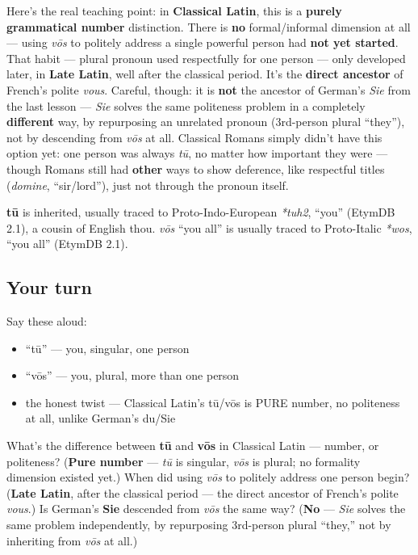 \begin{culture}
Here's the real teaching point: in \textbf{Classical Latin}, this is a \textbf{purely grammatical number} distinction. There is \textbf{no} formal/informal dimension at all — using \emph{vōs} to politely address a single powerful person had \textbf{not yet started}. That habit — plural pronoun used respectfully for one person — only developed later, in \textbf{Late Latin}, well after the classical period. It's the \textbf{direct ancestor} of French's polite \emph{vous}. Careful, though: it is \textbf{not} the ancestor of German's \emph{Sie} from the last lesson — \emph{Sie} solves the same politeness problem in a completely \textbf{different} way, by repurposing an unrelated pronoun (3rd-person plural \textquotedblleft{}they\textquotedblright{}), not by descending from \emph{vōs} at all. Classical Romans simply didn't have this option yet: one person was always \emph{tū}, no matter how important they were — though Romans still had \textbf{other} ways to show deference, like respectful titles (\emph{domine}, \textquotedblleft{}sir/lord\textquotedblright{}), just not through the pronoun itself.
\end{culture}

\begin{cousinweb}
\textbf{tū} is inherited, usually traced to Proto-Indo-European \emph{*tuh2}, \textquotedblleft{}you\textquotedblright{} (EtymDB 2.1), a cousin of English thou. \emph{vōs} \textquotedblleft{}you all\textquotedblright{} is usually traced to Proto-Italic \emph{*wos}, \textquotedblleft{}you all\textquotedblright{} (EtymDB 2.1).
\end{cousinweb}

\subsection*{Your turn}
Say these aloud:

\begin{itemize}
\raggedright
  \item \textquotedblleft{}tū\textquotedblright{} — you, singular, one person
  \item \textquotedblleft{}vōs\textquotedblright{} — you, plural, more than one person
  \item the honest twist — Classical Latin's tū/vōs is PURE number, no politeness at all, unlike German's du/Sie
\end{itemize}

\begin{tcolorbox}[breakable,colback=teal!4,colframe=teal!35!black,title={Before you move on}]
What's the difference between \textbf{tū} and \textbf{vōs} in Classical Latin — number, or politeness? (\textbf{Pure number} — \emph{tū} is singular, \emph{vōs} is plural; no formality dimension existed yet.) When did using \emph{vōs} to politely address one person begin? (\textbf{Late Latin}, after the classical period — the direct ancestor of French's polite \emph{vous}.) Is German's \textbf{Sie} descended from \emph{vōs} the same way? (\textbf{No} — \emph{Sie} solves the same problem independently, by repurposing 3rd-person plural \textquotedblleft{}they,\textquotedblright{} not by inheriting from \emph{vōs} at all.)
\end{tcolorbox}
